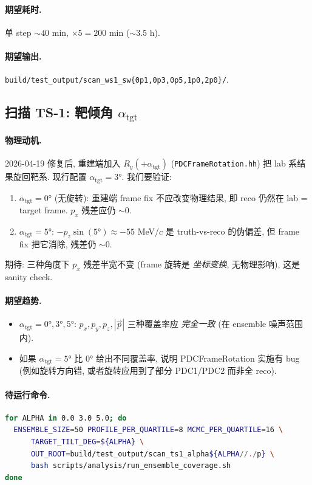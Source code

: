 \paragraph{期望耗时.} 单 step $\sim 40$ min, $\times 5 = 200$ min ($\sim 3.5$ h).
\paragraph{期望输出.} \texttt{build/test\_output/scan\_ws1\_sw\{0p1,0p3,0p5,1p0,2p0\}/}.

\subsection{扫描 TS-1: 靶倾角 $\alpha_{\mathrm{tgt}}$}
\label{sec:partIII:scans:ts1}

\paragraph{物理动机.}
2026-04-19 修复后, 重建端加入 $R_y(+\alpha_{\mathrm{tgt}})$ (\texttt{PDCFrameRotation.hh}) 把 lab 系结果旋回靶系. 现行配置 $\alpha_{\mathrm{tgt}} = 3°$. 我们要验证:
\begin{enumerate}[label=(\alph*), nosep]
  \item $\alpha_{\mathrm{tgt}} = 0°$ (无旋转): 重建端 frame fix 不应改变物理结果, 即 reco 仍然在 lab = target frame. $p_x$ 残差应仍 $\sim 0$.
  \item $\alpha_{\mathrm{tgt}} = 5°$: $-p_z \sin(5°) \approx -55$ MeV/$c$ 是 truth-vs-reco 的伪偏差, 但 frame fix 把它消除, 残差仍 $\sim 0$.
\end{enumerate}
期待: 三种角度下 $p_x$ 残差半宽不变 (frame 旋转是 \emph{坐标变换}, 无物理影响), 这是 sanity check.

\paragraph{期望趋势.}
\begin{itemize}[nosep]
  \item $\alpha_{\mathrm{tgt}} = 0°, 3°, 5°$: $p_x, p_y, p_z, |\vec p|$ 三种覆盖率应 \emph{完全一致} (在 ensemble 噪声范围内).
  \item 如果 $\alpha_{\mathrm{tgt}} = 5°$ 比 $0°$ 给出不同覆盖率, 说明 PDCFrameRotation 实施有 bug (例如旋转方向错, 或者旋转应用到了部分 PDC1/PDC2 而非全 reco).
\end{itemize}

\paragraph{待运行命令.}
\begin{lstlisting}[language=bash,caption={tilt scan TS-1},label=lst:partIII:ts1_cmd]
for ALPHA in 0.0 3.0 5.0; do
  ENSEMBLE_SIZE=50 PROFILE_PER_QUARTILE=8 MCMC_PER_QUARTILE=16 \
      TARGET_TILT_DEG=${ALPHA} \
      OUT_ROOT=build/test_output/scan_ts1_alpha${ALPHA//./p} \
      bash scripts/analysis/run_ensemble_coverage.sh
done
\end{lstlisting}

